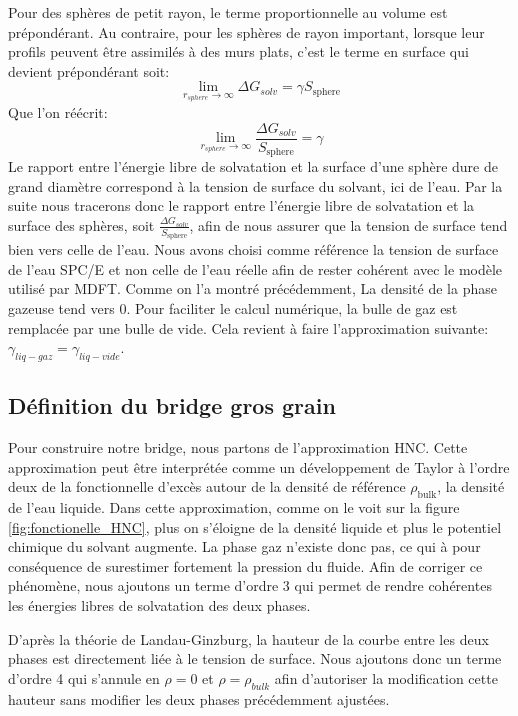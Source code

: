 Pour des sphères de petit rayon, le terme proportionnelle au volume est prépondérant.
Au contraire, pour les sphères de rayon important, lorsque leur profils peuvent être assimilés à des murs plats, c'est le terme en surface qui devient prépondérant soit:
\begin{equation}
\lim\limits_{r_{sphere} \to \infty} \Delta G_{solv} = \gamma S_{\mathrm{sphere}} 
\end{equation}
Que l'on réécrit:
\begin{equation}
\lim\limits_{r_{sphere} \to \infty} \frac{\Delta G_{solv}}{S_{\mathrm{sphere}}} = \gamma 
\end{equation}
Le rapport entre l'énergie libre de solvatation et la surface d'une sphère dure de grand diamètre correspond à la tension de surface du solvant, ici de l'eau.
Par la suite nous tracerons donc le rapport entre l'énergie libre de solvatation et la surface des sphères, soit $\frac{\Delta G_{solv}}{S_{\mathrm{sphere}}}$, afin de nous assurer que la tension de surface tend bien vers celle de l'eau.
Nous avons choisi comme référence la tension de surface de l'eau SPC/E et non celle de l'eau réelle afin de rester cohérent avec le modèle utilisé par MDFT.
Comme on l'a montré précédemment, La densité de la phase gazeuse tend vers 0. Pour faciliter le calcul numérique, la bulle de gaz est remplacée par une bulle de vide. Cela revient à faire l'approximation suivante: $\gamma_{liq-gaz} = \gamma_{liq-vide}$.



\subsection{Définition du bridge gros grain}
Pour construire notre bridge, nous partons de l'approximation HNC. Cette approximation peut être interprétée comme un développement de Taylor à l'ordre deux de la fonctionnelle d'excès autour de la densité de référence $\rho_{\mathrm{bulk}}$, la densité de l'eau liquide.
Dans cette approximation, comme on le voit sur la figure \ref{fig:fonctionelle_HNC}, plus on s'éloigne de la densité liquide et plus le potentiel chimique du solvant augmente. La phase gaz n'existe donc pas, ce qui à pour conséquence de surestimer fortement la pression du fluide.
Afin de corriger ce phénomène, nous ajoutons un terme d'ordre 3 qui permet de rendre cohérentes les énergies libres de solvatation des deux phases.

D'après la théorie de Landau-Ginzburg\cite{Ginzburg2009}, la hauteur de la courbe entre les deux phases est directement liée à le tension de surface. Nous ajoutons donc un terme d'ordre 4 qui s'annule en $\rho=0$ et $\rho=\rho_{bulk}$ afin d'autoriser la modification cette hauteur sans modifier les deux phases précédemment ajustées.

